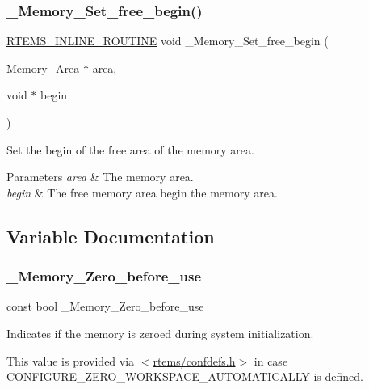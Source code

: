 \subsubsection{\texorpdfstring{\_Memory\_Set\_free\_begin()}{\_Memory\_Set\_free\_begin()}}
{\footnotesize\ttfamily \mbox{\hyperlink{group__RTEMSScoreBaseDefs_gac216239df231d5dbd15e3520b0b9313f}{R\+T\+E\+M\+S\+\_\+\+I\+N\+L\+I\+N\+E\+\_\+\+R\+O\+U\+T\+I\+NE}} void \+\_\+\+Memory\+\_\+\+Set\+\_\+free\+\_\+begin (\begin{DoxyParamCaption}\item[{\mbox{\hyperlink{structMemory__Area}{Memory\+\_\+\+Area}} $\ast$}]{area,  }\item[{void $\ast$}]{begin }\end{DoxyParamCaption})}



Set the begin of the free area of the memory area. 


\begin{DoxyParams}{Parameters}
{\em area} & The memory area. \\
\hline
{\em begin} & The free memory area begin the memory area. \\
\hline
\end{DoxyParams}


\subsection{Variable Documentation}
\mbox{\label{group__RTEMSScoreMemory_ga58fab34afaf489296d7ada0a582d766a}} 
\subsubsection{\texorpdfstring{\_Memory\_Zero\_before\_use}{\_Memory\_Zero\_before\_use}}
{\footnotesize\ttfamily const bool \+\_\+\+Memory\+\_\+\+Zero\+\_\+before\+\_\+use}



Indicates if the memory is zeroed during system initialization. 

This value is provided via $<$\mbox{\hyperlink{confdefs_8h}{rtems/confdefs.\+h}}$>$ in case C\+O\+N\+F\+I\+G\+U\+R\+E\+\_\+\+Z\+E\+R\+O\+\_\+\+W\+O\+R\+K\+S\+P\+A\+C\+E\+\_\+\+A\+U\+T\+O\+M\+A\+T\+I\+C\+A\+L\+LY is defined. 